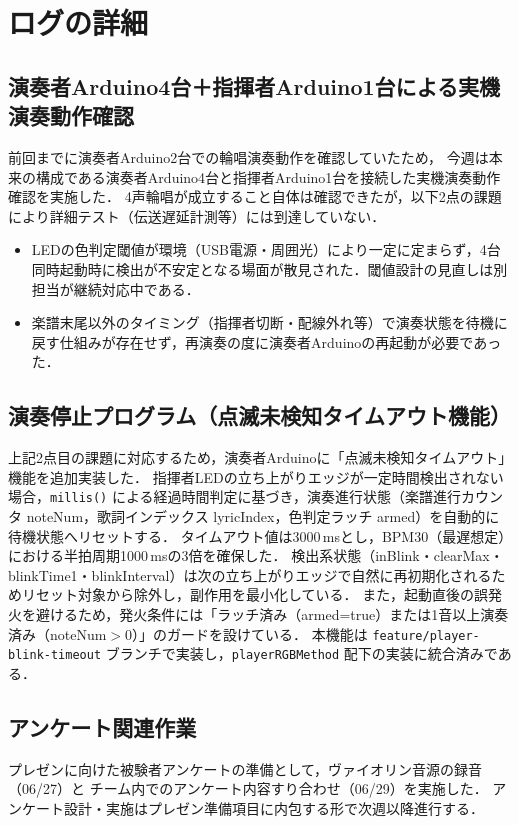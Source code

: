 \documentclass[lualatex,paper=a4paper,jafontsize=11.5pt,jafontscale=1.05]{jlreq}
\begin{document}
\section{ログの詳細}

\subsection{演奏者Arduino4台＋指揮者Arduino1台による実機演奏動作確認}
前回までに演奏者Arduino2台での輪唱演奏動作を確認していたため，
今週は本来の構成である演奏者Arduino4台と指揮者Arduino1台を接続した実機演奏動作確認を実施した．
4声輪唱が成立すること自体は確認できたが，以下2点の課題により詳細テスト（伝送遅延計測等）には到達していない．
\begin{itemize}
  \item LEDの色判定閾値が環境（USB電源・周囲光）により一定に定まらず，4台同時起動時に検出が不安定となる場面が散見された．閾値設計の見直しは別担当が継続対応中である．
  \item 楽譜末尾以外のタイミング（指揮者切断・配線外れ等）で演奏状態を待機に戻す仕組みが存在せず，再演奏の度に演奏者Arduinoの再起動が必要であった．
\end{itemize}

\subsection{演奏停止プログラム（点滅未検知タイムアウト機能）}
上記2点目の課題に対応するため，演奏者Arduinoに「点滅未検知タイムアウト」機能を追加実装した．
指揮者LEDの立ち上がりエッジが一定時間検出されない場合，\texttt{millis()}\cite{arduino_millis} による経過時間判定に基づき，演奏進行状態（楽譜進行カウンタ noteNum，歌詞インデックス lyricIndex，色判定ラッチ armed）を自動的に待機状態へリセットする．
タイムアウト値は3000\,msとし，BPM30（最遅想定）における半拍周期1000\,msの3倍を確保した．
検出系状態（inBlink・clearMax・blinkTime1・blinkInterval）は次の立ち上がりエッジで自然に再初期化されるためリセット対象から除外し，副作用を最小化している．
また，起動直後の誤発火を避けるため，発火条件には「ラッチ済み（armed=true）または1音以上演奏済み（noteNum$>$0）」のガードを設けている．
本機能は \texttt{feature/player-blink-timeout} ブランチで実装し，\texttt{playerRGBMethod} 配下の実装に統合済みである．

\subsection{アンケート関連作業}
プレゼンに向けた被験者アンケートの準備として，ヴァイオリン音源の録音（06/27）と
チーム内でのアンケート内容すり合わせ（06/29）を実施した．
アンケート設計・実施はプレゼン準備項目に内包する形で次週以降進行する．
\end{document}
